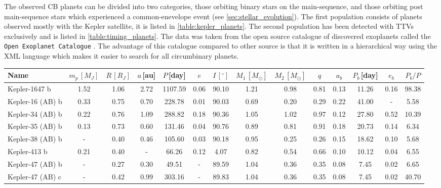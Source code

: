 \documentclass[ twoside,openright,titlepage,numbers=noenddot,headinclude,%
                footinclude=true,cleardoublepage=empty,abstractoff, %
                BCOR=5mm,paper=a4,fontsize=11pt,%
                american,%
                ]{scrreprt}
\begin{document}
The observed CB planets can be divided into two categories, those
orbiting binary stars on the main-sequence, and those orbiting post
main-sequence stars which experienced a common-enevelope event (see 
\cref{sec:stellar_evolution}). The first population consists of planets 
observed mostly with the Kepler satellite, it is listed in 
\cref{table:kepler_planets}. The second population has been detected with 
TTVs exclusively and is listed in \cref{table:timing_planets}. The data was 
taken from the open source catalogue of discovered exoplanets called 
the \texttt{Open Exoplanet Catalogue} \citep{catalogue}. The advantage of this
catalogue compared to other source is that it is written in a hierarchical way
using the XML language which makes it easier to search for all circumbinary
planets.
\begin{table}
\centering
\begin{tabular}{lccccccccccccc}
\toprule
    Name & $m_p\,[M_J]$ & $R\,[R_J]$ & $a\,$[au] &$P\,$[day] & $e$ & $I\,[^{\circ}]$ &  $M_1\,[M_\odot]$ &$M_2\,[M_\odot]$ &$q$ &  $a_b$ &   $P_b\,$[day] &  $e_b$ &  $P_b/P$\\
\midrule
Kepler-1647 b    &  1.52 &  1.06 &  2.72 &  1107.59 &  0.06 &  90.10 &    1.21 &    0.98 &  0.81 &      0.13 &     11.26 &      0.16 &      98.38 \\
    Kepler-16 (AB) b &  0.33 &  0.75 &  0.70 &   228.78 &  0.01 &  90.03 &    0.69 &    0.20 &  0.29 &      0.22 &     41.00 &       - &       5.58 \\
    Kepler-34 (AB) b &  0.22 &  0.76 &  1.09 &   288.82 &  0.18 &  90.36 &    1.05 &    1.02 &  0.97 &      0.12 &     27.80 &      0.52 &      10.39 \\
    Kepler-35 (AB) b &  0.13 &  0.73 &  0.60 &   131.46 &  0.04 &  90.76 &    0.89 &    0.81 &  0.91 &      0.18 &     20.73 &      0.14 &       6.34 \\
    Kepler-38 (AB) b &   - &  0.40 &  0.46 &   105.60 &  0.03 &  90.18 &    0.95 &    0.25 &  0.26 &      0.15 &       18.62&      0.10 &        5.68 \\
    Kepler-413 b     &  0.21 &  0.40 &   - &    66.26 &  0.12 &   4.07 &    0.82 &    0.54 &  0.66 &      0.10 &     10.12 &      0.04 &       6.55 \\
    Kepler-47 (AB) b &   - &  0.27 &  0.30 &    49.51 &   - &  89.59 &    1.04 &    0.36 &  0.35 &      0.08 &      7.45 &      0.02 &       6.65 \\
    Kepler-47 (AB) c &   - &  0.42 &  0.99 &   303.16 &   - &  89.83 &    1.04 &    0.36 &  0.35 &      0.08 &      7.45 &      0.02 &      40.70 \\

\end{tabular}
\end{table}
\end{document}
